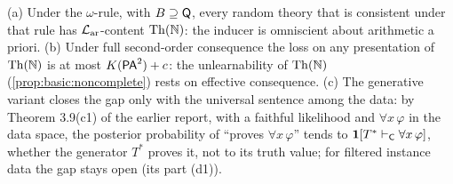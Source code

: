 \begin{remark}\label{rem:logic:closures}
(a) Under the $\omega$-rule, with $B\supseteq\mathsf{Q}$, every random theory that is consistent under that rule has $\mathcal{L}_{\mathrm{ar}}$-content $\mathrm{Th}(\mathbb N)$: the inducer is omniscient about arithmetic a priori. (b) Under full second-order consequence the loss on any presentation of $\mathrm{Th}(\mathbb N)$ is at most $K(\mathsf{PA}^2)+c$: the unlearnability of $\mathrm{Th}(\mathbb N)$ (\cref{prop:basic:noncomplete}) rests on effective consequence. (c) The generative variant closes the gap only with the universal sentence among the data: by Theorem 3.9(c1) of the earlier report, with a faithful likelihood and $\forall x\,\varphi$ in the data space, the posterior probability of ``proves $\forall x\,\varphi$'' tends to $\mathbf{1}[T^*\vdash_{\mathsf C}\forall x\,\varphi]$, whether the generator $T^*$ proves it, not to its truth value; for filtered instance data the gap stays open (its part (d1)).
\end{remark}

